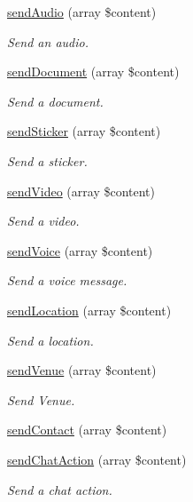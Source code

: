 \begin{DoxyCompactItemize}
\hyperlink{class_telegram_a178b081bbab51f83caa31e554b3e2ffe}{send\+Audio} (array \$content)
\begin{DoxyCompactList}\small\item\em Send an audio. \end{DoxyCompactList}\item 
\hyperlink{class_telegram_a25569ca763bd149891d86b89bc66cf54}{send\+Document} (array \$content)
\begin{DoxyCompactList}\small\item\em Send a document. \end{DoxyCompactList}\item 
\hyperlink{class_telegram_a0a176d232d8e7941184698447902beb6}{send\+Sticker} (array \$content)
\begin{DoxyCompactList}\small\item\em Send a sticker. \end{DoxyCompactList}\item 
\hyperlink{class_telegram_a789f27ed21d8a1232cc60832efdab17f}{send\+Video} (array \$content)
\begin{DoxyCompactList}\small\item\em Send a video. \end{DoxyCompactList}\item 
\hyperlink{class_telegram_a4faab9f92639453b851912d41ca1a3ca}{send\+Voice} (array \$content)
\begin{DoxyCompactList}\small\item\em Send a voice message. \end{DoxyCompactList}\item 
\hyperlink{class_telegram_ac395e843f13d36d70f57c2d26868a33f}{send\+Location} (array \$content)
\begin{DoxyCompactList}\small\item\em Send a location. \end{DoxyCompactList}\item 
\hyperlink{class_telegram_a4ad657480e7bc9575a71912eb85c92d5}{send\+Venue} (array \$content)
\begin{DoxyCompactList}\small\item\em Send Venue. \end{DoxyCompactList}\item 
\hyperlink{class_telegram_a5ba4fd675a877d995bb0d7305aa56324}{send\+Contact} (array \$content)
\item 
\hyperlink{class_telegram_aa8c4c54f8f2fcbb53de050458fb176b7}{send\+Chat\+Action} (array \$content)
\begin{DoxyCompactList}\small\item\em Send a chat action. \end{DoxyCompactList}\item 

\end{DoxyCompactItemize}
